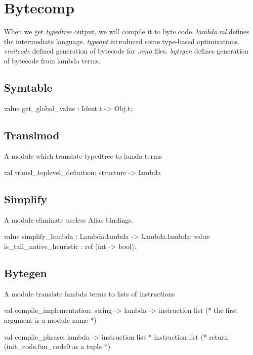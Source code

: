 
\section{Bytecomp}

When we get \textit{typedtree} output, we will compile it to byte
code.  \textit{lambda.ml} defines the intermediate
language. \textit{typeopt} introduced some type-based optimizations.
\textit{emitcode} defined generation of bytecode for \textit{.cmo}
files.  \textit{bytegen} defines generation of bytecode from lambda
terms.


\subsection{Symtable}

\begin{ocamlcode}
value get_global_value : Ident.t -> Obj.t;
\end{ocamlcode}

\subsection{Translmod}

A module which translate typedtree to lamda terms


\begin{ocamlcode}
val transl_toplevel_definition: structure -> lambda
\end{ocamlcode}


\subsection{Simplify}

A module eliminate useless Alias bindings.


\begin{ocamlcode}
  value simplify_lambda : Lambda.lambda -> Lambda.lambda;
  value is_tail_native_heuristic : ref (int -> bool);
\end{ocamlcode}

\subsection{Bytegen}
A module translate lambda terms to lists of instructions
\begin{ocamlcode}
val compile_implementation: string -> lambda -> instruction list
(* the first argument is a module name *)


val compile_phrase: lambda -> instruction list * instruction list
(* return (init_code,fun_code0 as a tuple *)
\end{ocamlcode}

